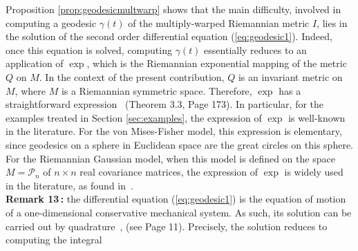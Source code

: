 \documentclass{svmult}
\begin{document}
Proposition \ref{prop:geodesicmultwarp} shows that the main difficulty, involved in computing a geodesic $\gamma(t)$ of the multiply-warped Riemannian metric $I$, lies in the solution of the second order differential equation (\ref{eq:geodesic1}). Indeed, once this equation is solved, computing $\gamma(t)$ essentially reduces to an application of $\exp$, which is the Riemannian exponential mapping of the metric $Q$ on $M$. In the context of the present contribution, $Q$ is an invariant metric on $M$, where $M$ is a Riemannian symmetric space. Therefore, $\exp$ has a straightforward expression~\cite{helgason} (Theorem 3.3, Page 173). In particular, for the examples treated in Section \ref{sec:examples}, the expression of $\exp$ is well-known in the literature. For the von Mises-Fisher model, this expression is elementary, since geodesics on a sphere in Euclidean space are the great circles on this sphere. For the Riemannian Gaussian model, when this model is defined on the space $M = \mathcal{P}_n$ of $n \times n$ real covariance matrices, the expression of $\exp$ is widely used in the literature, as found in~\cite{pennec2}. \\[0.1cm]
\textbf{Remark 13\,:} the differential equation (\ref{eq:geodesic1}) is the equation of motion of a one-dimensional conservative mechanical system. As such, its solution can be carried out by quadrature~\cite{gallavotti}, (see Page 11). Precisely, the solution reduces to computing the integral
\end{document}
